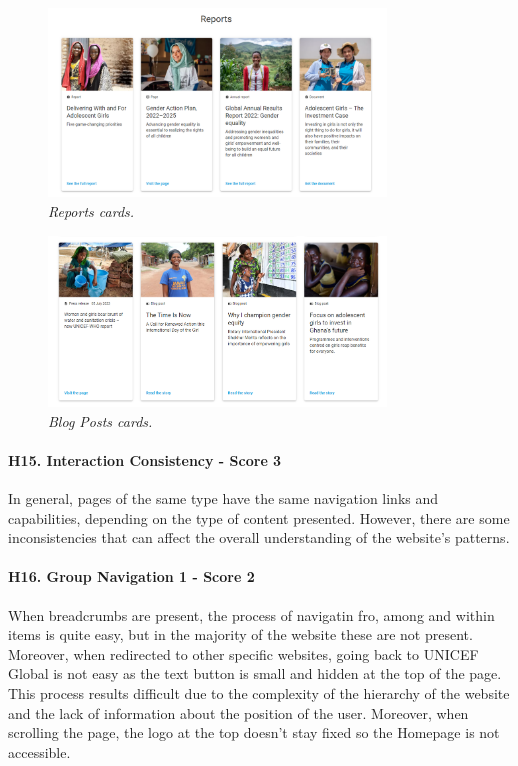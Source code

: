 \begin{figure}[h]
	\centering
	\begin{center}
		\includegraphics[width=0.8\textwidth]{Picture18.png}
	\end{center}
	\captionsetup{font=small}
	\caption{\textit{Reports cards.}}
	\label{fig:label18}
\end{figure}

\begin{figure}[h]
	\centering
	\begin{center}
		\includegraphics[width=0.8\textwidth]{Picture19.png}
	\end{center}
	\captionsetup{font=small}
	\caption{\textit{Blog Posts cards.}}
	\label{fig:label19}
\end{figure}

\paragraph*{H15. Interaction Consistency  - Score 3}
In general, pages of the same type have the same navigation links and capabilities, depending on the type of content presented. However, there are some inconsistencies that can affect the overall understanding of the website's patterns.

\paragraph*{H16. Group Navigation 1  - Score 2}
When breadcrumbs are present, the process of navigatin fro, among and within items is quite easy, but in the majority of the website these are not present. Moreover, when redirected to other specific websites, going back to UNICEF Global is not easy as the text button is small and hidden at the top of the page. This process results difficult due to the complexity of the hierarchy of the website and the lack of information about the position of the user. Moreover, when scrolling the page, the logo at the top doesn’t stay fixed so the Homepage is not accessible.

